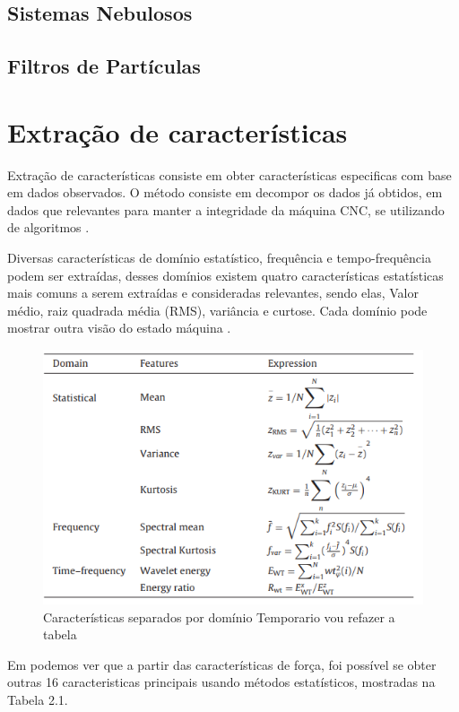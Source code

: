 \subsection{Sistemas Nebulosos}
\subsection{Filtros de Partículas}

\newpage
\section{Extração de características}

Extração de características consiste em obter características especificas com base em dados observados.  O método consiste em decompor os dados já obtidos, em dados que relevantes para manter a integridade da máquina CNC, se utilizando de algoritmos \cite{liao2014discovering}.

Diversas características de domínio estatístico, frequência e tempo-frequência podem ser extraídas, desses domínios existem quatro características estatísticas mais comuns a serem extraídas e consideradas relevantes, sendo elas, Valor médio, raiz quadrada média (RMS), variância e curtose. Cada domínio pode mostrar outra visão do estado máquina \cite{wang2015enhanced}.

\begin{figure}[h]
    \centering
    \includegraphics[scale=0.7]{img/tablect}
    \caption{Características separados por domínio \cite{wang2015enhanced} Temporario vou refazer a tabela}
\end{figure}

Em \cite{Li2009} podemos ver que a partir das características de força, foi possível se obter outras 16 caracteristicas principais usando métodos estatísticos, mostradas na Tabela 2.1.

